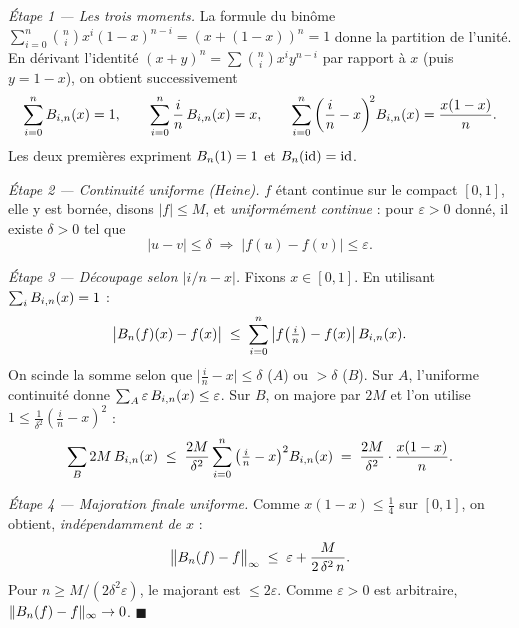 \begin{mdframed}[style=proofbar]
  \textit{Étape 1 — Les trois moments.}\enspace%
  La formule du binôme $\sum_{i=0}^n \binom{n}{i}x^i{(1-x)}^{n-i}={(x+(1-x))}^n=1$
  donne la partition de l'unité. En dérivant l'identité
  ${(x+y)}^n=\sum\binom{n}{i}x^i y^{n-i}$ par rapport à $x$ (puis $y=1-x$),
  on obtient successivement
  \[
    \sum_{i=0}^{n} B_{i,n}(x) = 1, \qquad
    \sum_{i=0}^{n} \frac{i}{n}\,B_{i,n}(x) = x, \qquad
    \sum_{i=0}^{n} {\left(\frac{i}{n}-x\right)}^{\!2} B_{i,n}(x)
       = \frac{x(1-x)}{n}.
  \]
  Les deux premières expriment $B_n(1)=1$ et $B_n(\mathrm{id})=\mathrm{id}$.

  \medskip
  \textit{Étape 2 — Continuité uniforme (Heine).}
  $f$ étant continue sur le compact $[0,1]$, elle y est bornée, disons
  $|f|\leq M$, et \emph{uniformément continue} : pour $\varepsilon>0$ donné,
  il existe $\delta>0$ tel que
  \[
    |u-v|\leq\delta \;\Longrightarrow\; |f(u)-f(v)|\leq\varepsilon.
  \]

  \medskip
  \textit{Étape 3 — Découpage selon $|i/n-x|$.}
  Fixons $x\in[0,1]$. En utilisant $\sum_iB_{i,n}(x)=1$ :
  \[
    \bigl|B_n(f)(x)-f(x)\bigr|
    \;\leq\; \sum_{i=0}^{n}\left|f\!\left(\tfrac{i}{n}\right)-f(x)\right|B_{i,n}(x).
  \]
  On scinde la somme selon que $\bigl|\tfrac{i}{n}-x\bigr|\leq\delta$ ($A$)
  ou $>\delta$ ($B$). Sur $A$, l'uniforme continuité donne
  $\sum_{A}\varepsilon\,B_{i,n}(x)\leq\varepsilon$. Sur $B$, on majore par
  $2M$ et l'on utilise $1 \leq \tfrac{1}{\delta^2}{\left(\tfrac{i}{n}-x\right)}^2$ :
  \[
    \sum_{B}2M\,B_{i,n}(x)
    \;\leq\; \frac{2M}{\delta^2}\sum_{i=0}^{n}
             {\left(\tfrac{i}{n}-x\right)}^2B_{i,n}(x)
    \;=\; \frac{2M}{\delta^2}\cdot\frac{x(1-x)}{n}.
  \]

  \medskip
  \textit{Étape 4 — Majoration finale uniforme.}
  Comme $x(1-x)\leq\tfrac14$ sur $[0,1]$, on obtient, \emph{indépendamment
  de $x$} :
  \[
    \bigl\|B_n(f)-f\bigr\|_\infty
    \;\leq\; \varepsilon + \frac{M}{2\,\delta^2\,n}.
  \]
  Pour $n\geq M/(2\delta^2\varepsilon)$, le majorant est $\leq 2\varepsilon$.
  Comme $\varepsilon>0$ est arbitraire, $\|B_n(f)-f\|_\infty\to 0$.
  \hfill$\blacksquare$
\end{mdframed}

\decsep{}


